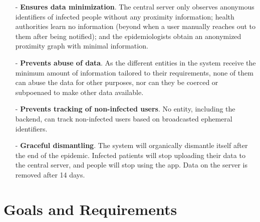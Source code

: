 \documentclass[12pt,a4paper]{article}
\begin{document}
\begin{itemize}\itemsep0pt
\item[-] \textbf{Ensures data minimization}. The central server only observes anonymous identifiers of infected people without any proximity information; health authorities learn no information (beyond when a user manually reaches out to them after being notified);
and the epidemiologists obtain an anonymized proximity graph with minimal information.
\item[-] \textbf{Prevents abuse of data}. As the different entities in the system receive the minimum amount of information tailored to their requirements, none of them can abuse the data for other purposes, nor can they be coerced or subpoenaed to make other data available.
\item[-] \textbf{Prevents tracking of non-infected users}. No entity, including the backend, can track non-infected users based on broadcasted ephemeral identifiers.
\item[-] \textbf{Graceful dismantling}. The system will organically dismantle itself after the end of the epidemic. Infected patients will stop uploading their data to the central server,
and people will stop using the app. Data on the server is removed after 14 days.
\end{itemize}
\clearpage
\section*{Goals and Requirements}
\end{document}

